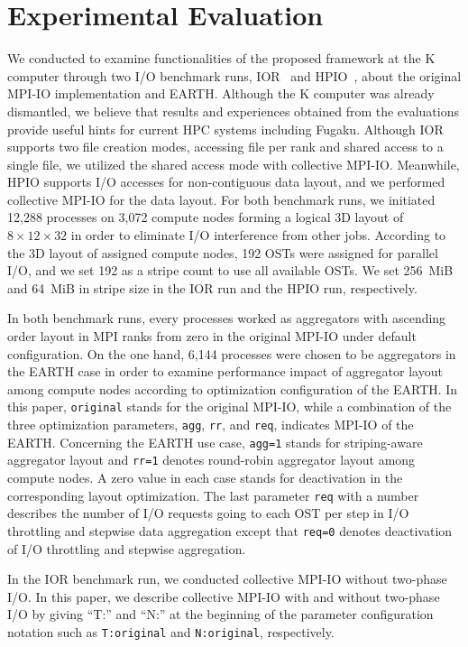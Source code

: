\documentclass{jhps}
\begin{document}
\section{Experimental Evaluation}
\label{sec:EVAL}

We conducted to examine functionalities of the proposed framework
at the K computer through two I/O benchmark runs,
IOR~\cite{IOR:web} and HPIO~\cite{ching:ipdps06},
about the original MPI-IO implementation and EARTH.
Although the K computer was already dismantled,
we believe that results and experiences obtained from the evaluations
provide useful hints for current HPC systems including Fugaku.
Although IOR supports two file creation modes, accessing
file per rank and shared access to a single file,
we utilized the shared access mode with collective MPI-IO.
Meanwhile, HPIO supports I/O accesses for non-contiguous data layout,
and we performed collective MPI-IO for the data layout.
For both benchmark runs, we initiated 12,288 processes on 3,072 compute nodes
forming a logical 3D layout of $8\times12\times32$ in order to eliminate I/O interference
from other jobs. According to the 3D layout of assigned compute nodes,
192 OSTs were assigned for parallel I/O, and we set 192 as a stripe count
to use all available OSTs.
We set 256~MiB and 64~MiB in stripe size in the IOR run and the HPIO run, respectively.

In both benchmark runs, every processes worked as aggregators
with ascending order layout in MPI ranks from zero in the original MPI-IO
under default configuration.
On the one hand, 6,144 processes were chosen to be aggregators in the EARTH case
in order to examine performance impact of aggregator layout among compute nodes
according to optimization configuration of the EARTH.
In this paper, {\tt original} stands for the original MPI-IO,
while a combination of the three optimization parameters,
{\tt agg}, {\tt rr}, and {\tt req}, indicates MPI-IO of the EARTH.
Concerning the EARTH use case, {\tt agg=1} stands for striping-aware aggregator layout
and {\tt rr=1} denotes round-robin aggregator layout among compute nodes.
A zero value in each case stands for deactivation in the corresponding layout optimization.
The last parameter {\tt req} with a number describes the number of I/O requests
going to each OST per step in I/O throttling and stepwise data aggregation
except that {\tt req=0} denotes deactivation of I/O throttling and stepwise aggregation.

In the IOR benchmark run, we conducted collective MPI-IO without two-phase I/O.
In this paper, we describe collective MPI-IO with and without two-phase I/O
by giving ``T:'' and ``N:'' at the beginning of the parameter configuration notation
such as {\tt T:original} and {\tt N:original}, respectively.
\end{document}
